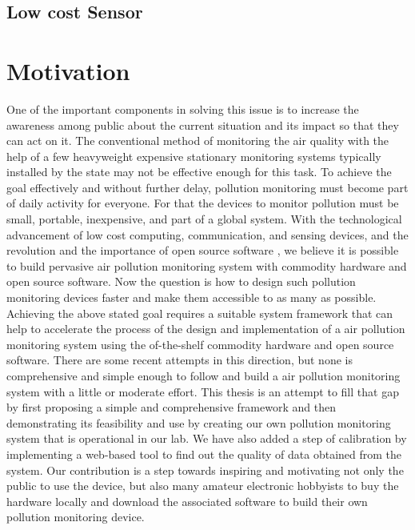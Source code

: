 \subsection{Low cost Sensor}







\section{Motivation}

One of the important components in solving this issue is to increase the awareness among public about the current situation and its impact so that they can act on it. The conventional method of monitoring the air quality with the help of a few heavyweight expensive stationary monitoring systems typically installed by the state may not be effective enough for this task. To achieve the goal effectively and without further delay, pollution monitoring must become part of daily activity for everyone. For that the devices to monitor pollution must be small, portable, inexpensive, and part of a global system. With the technological advancement of low cost computing, communication, and sensing devices, and the revolution and the importance of open source software \cite{Anthes2016}, we believe it is possible to build pervasive air pollution monitoring system with commodity hardware and open source software. Now the question is how to design such pollution monitoring devices faster and make them accessible to as many as possible. 
\\
Achieving the above stated goal requires a suitable system framework that can help to accelerate the process of the design and implementation of a air pollution monitoring system using the of-the-shelf commodity hardware and open source software. There are some recent attempts in this direction, but none is comprehensive and simple enough to follow and build a air pollution monitoring system with a little or moderate effort. This thesis is an attempt to fill that gap by first proposing a simple and comprehensive framework and then demonstrating its feasibility and use by creating our own pollution monitoring system that is operational in our lab. We have also added a step of calibration by implementing a web-based tool to find out the quality of data obtained from the system. Our contribution is a step towards inspiring and motivating not only the public to use the device, but also many amateur electronic hobbyists to buy the hardware locally and download the associated software to build their own pollution monitoring device.



